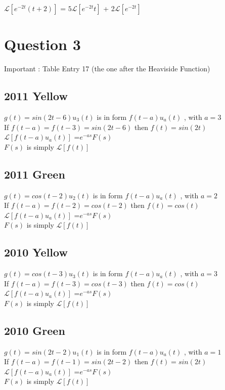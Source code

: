 \documentclass[11pt,a4paper,titlepage,oneside,openany]{article}
\numberwithin{equation}{section}
\numberwithin{algorithm}{section}
\numberwithin{figure}{section}
\numberwithin{table}{section}
\begin{document}
$\mathcal{L}[e^{-2t}(t+2)]$ = $5\mathcal{L}[e^{-2t}t]$ + 2$\mathcal{L}[e^{-2t}]$

\newpage
\section*{Question 3}
Important : Table Entry 17 (the one after the Heaviside Function)
\subsection*{2011 Yellow}
$g(t) = sin(2t - 6)u_3(t)$ is in form $f(t-a)u_a(t)$ , with $a=3$ \\
If $f(t-a) = f(t-3) = sin(2t - 6)$ then $f(t)= sin(2t)$ \\
$\mathcal{L}[f(t-a)u_a(t)]$ =$e^{-as}F(s)$ \\
$F(s)$ is simply $\mathcal{L}[f(t)]$\\
\subsection*{2011 Green}
$g(t) = cos(t-2)u_2(t)$ is in form $f(t-a)u_a(t)$ , with $a=2$ \\
If $f(t-a) = f(t-2) = cos(t-2)$ then $f(t)= cos(t)$ \\
$\mathcal{L}[f(t-a)u_a(t)]$ =$e^{-as}F(s)$ \\
$F(s)$ is simply $\mathcal{L}[f(t)]$\\
\subsection*{2010 Yellow}
$g(t) = cos(t-3)u_3(t)$ is in form $f(t-a)u_a(t)$ , with $a=3$ \\
If $f(t-a) = f(t-3) = cos(t-3)$ then $f(t)= cos(t)$ \\
$\mathcal{L}[f(t-a)u_a(t)]$ =$e^{-as}F(s)$ \\
$F(s)$ is simply $\mathcal{L}[f(t)]$\\
\subsection*{2010 Green}
$g(t) = sin(2t - 2)u_1(t)$ is in form $f(t-a)u_a(t)$ , with $a=1$ \\
If $f(t-a) = f(t-1) = sin(2t - 2)$ then $f(t)= sin(2t)$ \\
$\mathcal{L}[f(t-a)u_a(t)]$ =$e^{-as}F(s)$ \\
$F(s)$ is simply $\mathcal{L}[f(t)]$\\
\end{document}
